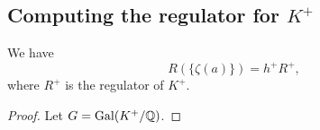 \subsection{Computing the regulator for $K^+$}

\begin{lemma}\label{lem:reg_Ra}
    We have
    $$
    R(\{\zeta(a)\}) = h^+ R^+, 
    $$
    where $R^+$ is the regulator of $K^+$.
\end{lemma}

\begin{proof}
    Let $G = \operatorname{Gal}(K^+ / \mathbb{Q})$.  
\end{proof}

